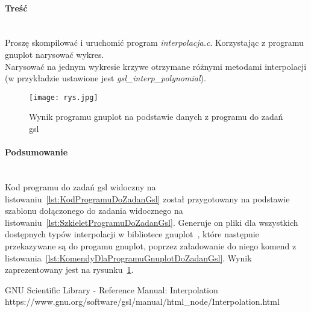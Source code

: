 \paragraph{Treść}~\\
Proszę skompilować i uruchomić program \textit{interpolacja.c}.
Korzystając z programu gnuplot narysować wykres.\\
Narysować na jednym wykresie krzywe otrzymane różnymi metodami interpolacji (w przykładzie ustawione jest \textit{gsl\_interp\_polynomial}).







\begin{figure}[h]
  \caption{Wynik programu gnuplot na podstawie danych z programu do zadań gsl}
  \label{fig:WynikProgramuGnuplotNaPodstawieDanychZProgramuDoZadanGsl}
  \centering
  \texttt{[image: rys.jpg]}
\end{figure}

\paragraph{Podsumowanie}~\\
Kod programu do zadań gsl widoczny na listowaniu~\ref{lst:KodProgramuDoZadanGsl} został przygotowany na podstawie szablonu dołączonego do zadania widocznego na listowaniu~\ref{lst:SzkieletProgramuDoZadanGsl}.
Generuje on pliki dla wszystkich dostępnych typów interpolacji w bibliotece gnuplot~\cite{GslManualInterpolation}, które następnie przekazywane są do progamu gnuplot, poprzez załadowanie do niego komend z listowania~\ref{lst:KomendyDlaProgramuGnuplotDoZadanGsl}.
Wynik zaprezentowany jest na rysunku~\ref{fig:WynikProgramuGnuplotNaPodstawieDanychZProgramuDoZadanGsl}.

\begin{thebibliography}{9}
   GNU Scientific Library - Reference Manual: Interpolation https://www.gnu.org/software/gsl/manual/html\_node/Interpolation.html
\end{thebibliography}
